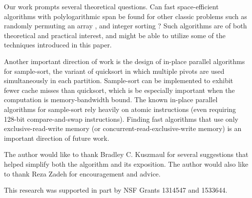\documentclass[sigconf]{acmart}
\renewcommand{\paragraph}[1]{\vspace{0.09in}\noindent{\bf \boldmath #1.}}
\theoremstyle{remark}
\theoremstyle{remark}
\begin{document}
Our work prompts several theoretical questions. Can fast
space-efficient algorithms with polylogarithmic span be found for
other classic problems such as randomly permuting an array
\cite{Anderson90, AlonsoSc96, ShunGu15}, and integer sorting
\cite{Rajasekaran92, HanHe12, AlbersHa97, Han01, GerbessiotisSi04}?
Such algorithms are of both theoretical and practical interest, and
might be able to utilize some of the techniques introduced in this
paper.

Another important direction of work is the design of in-place parallel
algorithms for sample-sort, the variant of quicksort in which multiple
pivots are used simultaneously in each partition. Sample-sort can be
implemented to exhibit fewer cache misses than quicksort, which is be
especially important when the computation is memory-bandwidth
bound. The known in-place parallel algorithms for sample-sort rely
heavily on atomic instructions \cite{AxtmannWi17} (even requiring
128-bit compare-and-swap instructions). Finding fast algorithms that
use only exclusive-read-write memory (or
concurrent-read-exclusive-write memory) is an important direction of
future work.


\paragraph{Acknowledgments} The author would like to thank Bradley C. Kuszmaul for several suggestions that helped simplify both the algorithm and its exposition. The author would also like to thank Reza Zadeh for encouragement and advice.

This research was supported in part by NSF Grants 1314547 and 1533644.




\end{document}
